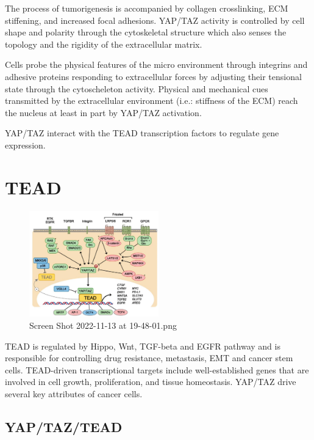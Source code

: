 The process of tumorigenesis is accompanied by collagen crosslinking, ECM stiffening, and increased focal adhesions. YAP/TAZ activity is controlled by cell shape and polarity through the cytoskeletal structure which also senses the topology and the rigidity of the extracellular matrix.

Cells probe the physical features of the micro environment through integrins and adhesive proteins responding to extracellular forces by adjusting their tensional state through the cytoscheleton activity. Physical and mechanical cues transmitted by the extracellular environment (i.e.: stiffness of the ECM) reach the nucleus at least in part by YAP/TAZ activation.

YAP/TAZ interact with the TEAD transcription factors to regulate gene expression.

\hypertarget{tead}{%
\section{TEAD}\label{tead}}

\begin{figure}
\centering
\includegraphics[width=0.5\textwidth]{../_resources/Screen_Shot_2022-11-13_at_19-48-01.png}
\caption{Screen Shot 2022-11-13 at 19-48-01.png}
\end{figure}

TEAD is regulated by Hippo, Wnt, TGF-beta and EGFR pathway and is responsible for controlling drug resistance, metastasis, EMT and cancer stem cells. TEAD-driven transcriptional targets include well-established genes that are involved in cell growth, proliferation, and tissue homeostasis. YAP/TAZ drive several key attributes of cancer cells.

\hypertarget{yaptaztead}{%
\subsection{YAP/TAZ/TEAD}\label{yaptaztead}}

